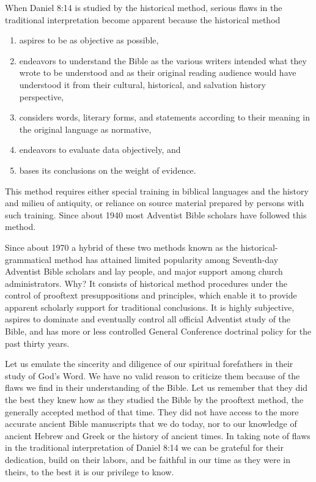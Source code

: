 When Daniel 8:14 is studied by the historical method, serious flaws in the
traditional interpretation become apparent because the historical method
\begin{enumerate}
    \item
aspires to be as objective as possible,
    \item endeavors to understand the
Bible as the various writers intended what they wrote to be understood and
as their original reading audience would have understood it from their
cultural, historical, and salvation history perspective,
    \item considers
words, literary forms, and statements according to their meaning in the
original language as normative,
    \item endeavors to evaluate data objectively,
and
    \item bases its conclusions on the weight of evidence.
\end{enumerate}
This method
requires either special training in biblical languages and the history and
milieu of antiquity, or reliance on source material prepared by persons with
such training. Since about 1940 most Adventist Bible scholars have followed
this method.

Since about 1970 a hybrid of these two methods known as the
historical-grammatical method\cite{71} has attained limited popularity among
Seventh-day Adventist Bible scholars and lay people, and major support among
church administrators. Why? It consists of historical method procedures
under the control of prooftext presuppositions and principles, which enable
it to provide apparent scholarly support for traditional conclusions. It is
highly subjective, aspires to dominate and eventually control all official
Adventist study of the Bible, and has more or less controlled General
Conference doctrinal policy for the past thirty years.

Let us emulate the sincerity and diligence of our spiritual forefathers in
their study of God's Word. We have no valid reason to criticize them because
of the flaws we find in their understanding of the Bible. Let us remember
that they did the best they knew how as they studied the Bible by the 
prooftext method, the generally accepted method of that time. They did not
have access to the more accurate ancient Bible manuscripts that we do today,
nor to our knowledge of ancient Hebrew and Greek or the history of ancient
times. In taking note of flaws in the traditional interpretation of Daniel
8:14 we can be grateful for their dedication, build on their labors, and be
faithful in our time as they were in theirs, to the best it is our privilege
to know.

